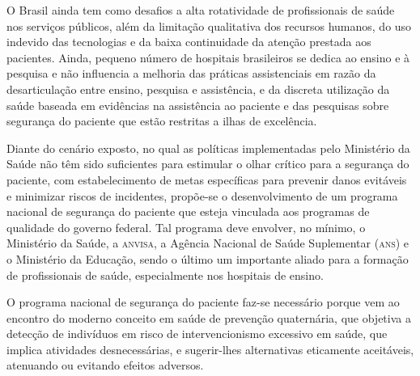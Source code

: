 \documentclass{article}
\begin{document}
O Brasil ainda tem como desafios a alta rotatividade de profissionais de saúde nos serviços
        públicos, além da limitação qualitativa dos recursos humanos, do uso indevido das
        tecnologias e da baixa continuidade da atenção prestada aos pacientes. %
 Ainda, pequeno número de hospitais brasileiros se dedica ao ensino e à pesquisa e
        não influencia a melhoria das práticas assistenciais em razão da desarticulação entre
        ensino, pesquisa e assistência, e da discreta utilização da saúde baseada em evidências na
        assistência ao paciente e das pesquisas sobre segurança do paciente que estão restritas a
        ilhas de excelência. %


Diante do cenário exposto, no qual as políticas implementadas pelo Ministério da Saúde não
        têm sido suficientes para estimular o olhar crítico para a segurança do paciente, com
        estabelecimento de metas específicas para prevenir danos evitáveis e minimizar riscos de
        incidentes, propõe-se o desenvolvimento de um programa nacional de segurança do paciente que
        esteja vinculada aos programas de qualidade do governo federal. Tal programa deve envolver,
        no mínimo, o Ministério da Saúde, a \textsc{anvisa}, a Agência Nacional de Saúde Suplementar (\textsc{ans}) e
        o Ministério da Educação, sendo o último um importante aliado para a formação de
        profissionais de saúde, especialmente nos hospitais de ensino.

O programa nacional de segurança do paciente faz-se necessário porque vem ao encontro do
        moderno conceito em saúde de prevenção quaternária, que objetiva a detecção de indivíduos em
        risco de intervencionismo excessivo em saúde, que implica atividades desnecessárias, e
        sugerir-lhes alternativas eticamente aceitáveis, atenuando ou evitando efeitos adversos.
\end{document}
